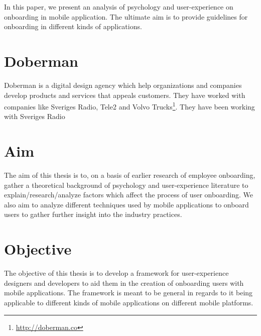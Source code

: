 In this paper, we present an analysis of psychology and user-experience on onboarding in mobile application. The ultimate aim is to provide guidelines for onboarding in different kinds of applications.

\section{Doberman}
Doberman is a digital design agency which help organizations and companies develop products and services that appeals customers. They have worked with companies like Sveriges Radio, Tele2 and Volvo Trucks\footnote{\url{http://doberman.co}}. They have been working with Sveriges Radio

\section{Aim}
The aim of this thesis is to, on a basis of earlier research of employee onboarding, gather a theoretical background of psychology and user-experience literature to explain/research/analyze factors which affect the process of user onboarding. We also aim to analyze different techniques used by mobile applications to onboard users to gather further insight into the industry practices.

\section{Objective}
The objective of this thesis is to develop a framework for user-experience designers and developers to aid them in the creation of onboarding users with mobile applications. The framework is meant to be general in regards to it being applicable to different kinds of mobile applications on different mobile platforms.

